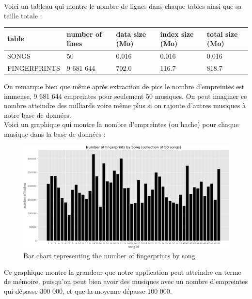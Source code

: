 \documentclass[11pt, report, french]{scrreprt}
\begin{document}
Voici un tableau qui montre le nombre de lignes dans chaque tables ainsi que sa taille totale :

\begin{center}
	\begin{tabular}{ | m{3.5cm} || m{3cm}| m{3cm} | m{3cm} | m{3cm} | } 
		\hline
		table & number of lines & data size (Mo) & index size (Mo) & total size (Mo) \\ 
		\hline
		\hline
		SONGS & 50 & 0.016 & 0.016 & 0.016 \\ 
		\hline
		FINGERPRINTS & 9 681 644 & 702.0 & 116.7 & 818.7 \\ 
		\hline
	\end{tabular}
\end{center}

On remarque bien que même après extraction de pics le nombre d'empreintes est immense, 9 681 644 empreintes pour seulement 50 musiques. On peut imaginer ce nombre atteindre des milliards voire même plus si on rajoute d'autres musiques à notre base de données.\\

\newpage
Voici un graphique qui montre la nombre d'empreintes (ou hache) pour chaque musique dans la base de données : \\

\begin{figure}[H]
	\centering
	\includegraphics[scale=0.55]{img/histogram1.png}
	\caption{Bar chart representing the number of fingerprints by song}
\end{figure}

\vspace{0.5cm}
Ce graphique montre la grandeur que notre application peut atteindre en terme de mémoire, puisqu'on peut bien avoir des musiques avec un nombre d'empreintes qui dépasse 300 000, et que la moyenne dépasse 100 000.\\\par
\end{document}
